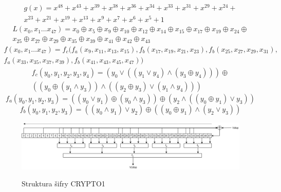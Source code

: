 \begin{multline}
    \label{generatingPolynomial}
    g(x) = x^{48} + x^{43} + x^{39} + x^{38} + x^{36} + x^{34} + x^{33} + x^{31} + x^{29} + x^{24} + \\
     x^{23} + x^{21} + x^{19} + x^{13} + x^{9} + x^{7} + x^{6} + x^{5} + 1  %
\end{multline}
\begin{multline}
    \label{feedbackFunction}
    L(x_0, x_1 \dots x_{47}) = x_{0} \oplus x_{5} \oplus x_{9} \oplus x_{10} \oplus x_{12} \oplus x_{14} \oplus x_{15} \oplus x_{17} \oplus x_{19} \oplus x_{24} \oplus \\ 
    x_{25} \oplus x_{27} \oplus x_{29} \oplus x_{35} \oplus x_{39} \oplus x_{41} \oplus x_{42} \oplus x_{43}
\end{multline}
\begin{multline}
    \label{filterFunction}
    f(x_0, x_1 \dots x_{47}) = f_c(f_a(x_{9},x_{11},x_{13},x_{15}),
                               f_b(x_{17},x_{19},x_{21},x_{23}),
                               f_b(x_{25},x_{27},x_{29},x_{31}), \\
                               f_a(x_{33},x_{35},x_{37},x_{39}),
                               f_b(x_{41},x_{43},x_{45},x_{47}))
\end{multline}
\begin{multline}
    \label{filterFunctionC}
    f_c(y_0,y_1,y_2,y_3,y_4) = 
    (y_0 \lor ((y_1 \lor y_4) \land (y_3 \oplus y_4))) \oplus \\
    ((y_0 \oplus(y_1 \land y_3)) \land ((y_2 \oplus y_3) \lor (y_1\land y_4)))
\end{multline}
\begin{equation}
    \label{filterFunctionA}
    f_a(y_0,y_1,y_2,y_3) = 
    ((y_0 \lor y_1) \oplus (y_0 \land y_3)) \oplus (y_2 \land ((y_0 \oplus y_1) \lor y_3))
\end{equation}
\begin{equation}
    \label{filterFunctionB}
    f_b(y_0,y_1,y_2,y_3) = ((y_0 \land y_1) \lor y_2) \oplus ((y_0 \oplus y_1) \land (y_2 \lor y_3))
\end{equation}

\begin{figure}[ht]\centering
  \centering
  
  \includegraphics[width=\linewidth]{obrazky-figures/StrukturaSifry.png}\\[1pt]  
  \caption{Struktura šifry CRYPTO1\cite{Wirelessly_Pickpocketing}}    
  \label{obrazekStrukturaSifry}
\end{figure}

